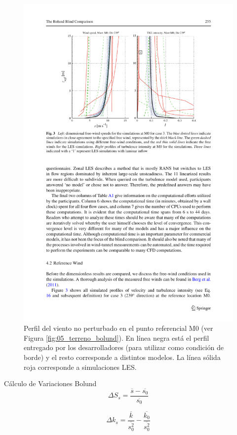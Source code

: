 \documentclass[mathserif,10pt]{beamer}
\begin{document}
\begin{frame}{}
\begin{figure}[H]
	\centering
	\includegraphics[width=0.85\linewidth,trim={2.7cm 14.3cm 2.0cm 2cm},clip]{fig/an1/bolund1.pdf}%
	\caption{Perfil del viento no perturbado en el punto referencial M0 (ver Figura \ref{fig:05_terreno_bolund}). En línea negra está el perfil entregado por los desarrolladores (para utilizar como condición de borde) y el resto corresponde a distintos modelos. La línea sólida roja corresponde a simulaciones LES.}
	\label{fig:an1_m0}
\end{figure}
\end{frame}

\begin{frame}{Cálculo de Variaciones Bolund}
	\begin{equation}
	\Delta S_s = \frac{\overline{s} - \overline{s_0}}{\overline{s_0}}
	\end{equation}
	
	\bigskip
	
	\begin{equation}
	\Delta k_s = \frac{\overline{k}}{\overline{s_0^2}} - \frac{\overline{k_0}}{\overline{s_0^2}}
	\end{equation}
\end{frame}
\end{document}
